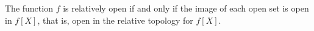 The function $f$ is relatively open if and only if the image of each open set is open in $f[X]$, that is, open in the relative topology for $f[X]$.
